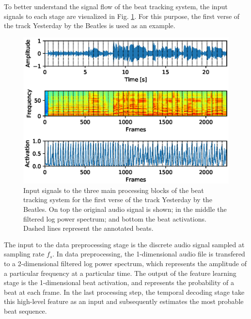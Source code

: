 \documentclass{scrartcl}
\begin{document}
To better understand the signal flow of the beat tracking system, the input signals to each stage are visualized in Fig. \ref{fig:pipeline}. For this purpose, the first verse of the track Yesterday by the Beatles is used as an example.
\begin{figure}[htbp]
\centering
\includegraphics[scale=0.82,trim={0.4cm 0.4cm 0cm 0.2cm},clip]{figures/pipeline.eps}
\caption{Input signals to the three main processing blocks of the beat tracking system for the first verse of the track Yesterday by the Beatles. On top the original audio signal is shown; in the middle the filtered log power spectrum; and bottom the beat activations. Dashed lines represent the annotated beats.}
\label{fig:pipeline}
\end{figure}
The input to the data preprocessing stage is the discrete audio signal sampled at sampling rate $f_s$. In data preprocessing, the 1-dimensional audio file is transfered to a 2-dimensional filtered log power spectrum, which represents the amplitude of a particular frequency at a particular time. The output of the feature learning stage is the 1-dimensional beat activation, and represents the probability of a beat at each frame. In the last processing step, the temporal decoding stage take this high-level feature as an input and subsequently estimates the most probable beat sequence.
\end{document}
